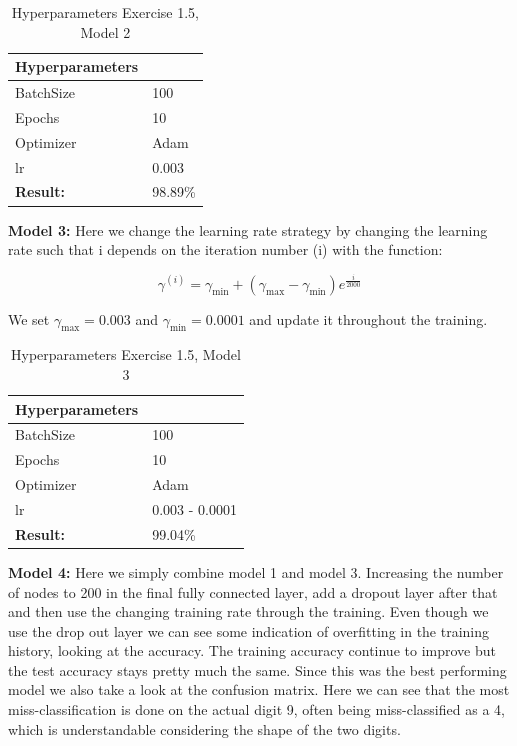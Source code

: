 \documentclass[a4paper,10pt]{article}
\begin{document}
\begin{table}[ht!]
\centering
\begin{tabular}{ll}\hline
 \textbf{Hyperparameters}&    \\ \hline
 BatchSize&  100  \\
 Epochs&  10 \\ 
 Optimizer& Adam  \\
 lr& 0.003\\ \hline
\textbf{Result: }&   98.89\% \\ \hline
\end{tabular}
\caption{Hyperparameters Exercise 1.5, Model 2}
\label{tab:tab7}
\end{table}

\textbf{Model 3:} Here we change the learning rate strategy by changing the learning rate such that i depends on the iteration number (i) with the function:

    \begin{equation}
        \gamma^{(i)} = \gamma_{\text{min}} + (\gamma_{\text{max}} - \gamma_{\text{min}})e^{\frac{i} {2000} }
    \end{equation}

We set $\gamma_{\text{max}} = 0.003$ and $\gamma_{\text{min}} = 0.0001$ and update it throughout the training.

\begin{table}[ht!]
\centering
\begin{tabular}{ll}\hline
 \textbf{Hyperparameters}&    \\ \hline
 BatchSize&  100  \\
 Epochs&  10 \\ 
 Optimizer& Adam  \\
 lr& 0.003 - 0.0001 \\ \hline
\textbf{Result: }&   99.04\% \\ \hline
\end{tabular}
\caption{Hyperparameters Exercise 1.5, Model 3}
\label{tab:tab7}
\end{table}

\newpage

\textbf{Model 4:} Here we simply combine model 1 and model 3. Increasing the number of nodes to 200 in the final fully connected layer, add a dropout layer after that and then use the changing training rate through the training. Even though we use the drop out layer we can see some indication of overfitting in the training history, looking at the accuracy. The training accuracy continue to improve but the test accuracy stays pretty much the same. Since this was the best performing model we also take a look at the confusion matrix. Here we can see that the most miss-classification is done on the actual digit 9, often being miss-classified as a 4, which is understandable considering the shape of the two digits. 
\end{document}

